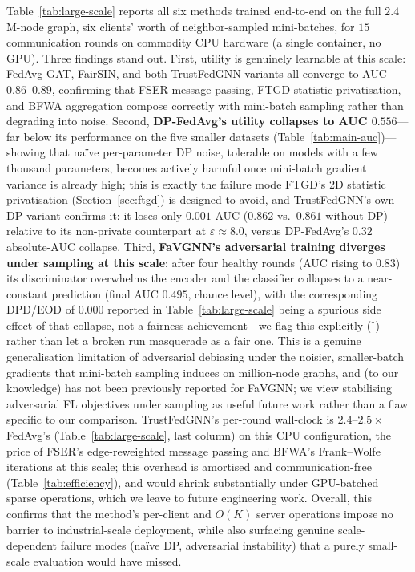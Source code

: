 Table~\ref{tab:large-scale} reports all six methods trained end-to-end on the
full $2.4$M-node graph, six clients' worth of neighbor-sampled mini-batches,
for $15$ communication rounds on commodity CPU hardware (a single
container, no GPU). Three findings stand out. First, utility is genuinely
learnable at this scale: FedAvg-GAT, FairSIN, and both TrustFedGNN variants all
converge to AUC $0.86$--$0.89$, confirming that FSER message passing, FTGD
statistic privatisation, and BFWA aggregation compose correctly with
mini-batch sampling rather than degrading into noise. Second,
\textbf{DP-FedAvg's utility collapses to AUC $0.556$}---far below its
performance on the five smaller datasets (Table~\ref{tab:main-auc})---showing
that naïve per-parameter DP noise, tolerable on models with a few thousand
parameters, becomes actively harmful once mini-batch gradient variance is
already high; this is exactly the failure mode FTGD's 2D statistic
privatisation (Section~\ref{sec:ftgd}) is designed to avoid, and TrustFedGNN's
own DP variant confirms it: it loses only $0.001$ AUC ($0.862$ vs.\ $0.861$
without DP) relative to its non-private counterpart at $\varepsilon\approx 8.0$,
versus DP-FedAvg's $0.32$ absolute-AUC collapse. Third,
\textbf{FaVGNN's adversarial training diverges under sampling at this scale}:
after four healthy rounds (AUC rising to $0.83$) its discriminator overwhelms
the encoder and the classifier collapses to a near-constant prediction (final
AUC $0.495$, chance level), with the corresponding DPD/EOD of $0.000$ reported
in Table~\ref{tab:large-scale} being a spurious side effect of that collapse,
not a fairness achievement---we flag this explicitly ($^{\dagger}$) rather
than let a broken run masquerade as a fair one. This is a genuine
generalisation limitation of adversarial debiasing under the noisier,
smaller-batch gradients that mini-batch sampling induces on million-node
graphs, and (to our knowledge) has not been previously reported for FaVGNN;
we view stabilising adversarial FL objectives under sampling as useful future
work rather than a flaw specific to our comparison. TrustFedGNN's per-round
wall-clock is $2.4$--$2.5\times$ FedAvg's (Table~\ref{tab:large-scale},
last column) on this CPU configuration, the price of FSER's edge-reweighted
message passing and BFWA's Frank--Wolfe iterations at this scale; this
overhead is amortised and communication-free (Table~\ref{tab:efficiency}), and
would shrink substantially under GPU-batched sparse operations, which we
leave to future engineering work. Overall, this confirms that the method's
per-client and $O(K)$ server operations impose no barrier to industrial-scale
deployment, while also surfacing genuine scale-dependent failure modes
(naïve DP, adversarial instability) that a purely small-scale evaluation
would have missed.

